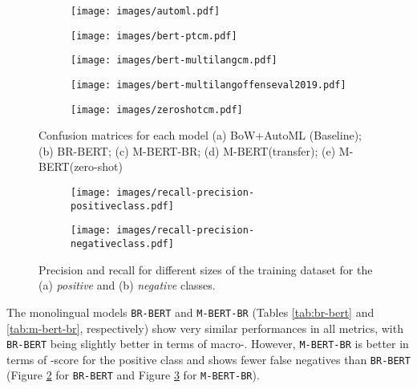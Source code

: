 \documentclass[11pt,a4paper]{article}
\begin{document}
\begin{figure*}[!ht]
\centering
\begin{subfigure}{.4\columnwidth}
  \centering
\texttt{[image: images/automl.pdf]}
  \caption{}
  \label{fig:cm-bow}
\end{subfigure}
\begin{subfigure}{.4\columnwidth}
\centering
\texttt{[image: images/bert-ptcm.pdf]}
  \caption{}
  \label{fig:cm-br-bert}
\end{subfigure}
\begin{subfigure}{.4\columnwidth}
  \centering
\texttt{[image: images/bert-multilangcm.pdf]}
  \caption{}
  \label{fig:cm-m-bert-br}
\end{subfigure}
\begin{subfigure}{.4\columnwidth}
  \centering
\texttt{[image: images/bert-multilangoffenseval2019.pdf]}
  \caption{}
  \label{fig:cm-m-bert-zero}
\end{subfigure}
\begin{subfigure}{.4\columnwidth}
  \centering
\texttt{[image: images/zeroshotcm.pdf]} 
  \caption{}
  \label{fig:cm-m-bert-transfer}
\end{subfigure}
\caption{Confusion matrices for each model (a) BoW+AutoML (Baseline); (b) BR-BERT; (c) M-BERT-BR; (d) M-BERT(transfer); (e) M-BERT(zero-shot)}
\label{fig:fig}
\end{figure*}

\begin{figure*}
\begin{subfigure}{.5\textwidth}
  \centering
\texttt{[image: images/recall-precision-positiveclass.pdf]}
  \caption{}
  \label{fig:learning-curve-positive}
\end{subfigure}
\begin{subfigure}{.5\textwidth}
  \centering
\texttt{[image: images/recall-precision-negativeclass.pdf]}
  \caption{}
  \label{fig:learning-curve-negative}
  \end{subfigure}
\caption{Precision and recall for different sizes of the training dataset for the (a) \textit{positive} and (b) \textit{negative} classes.}
\label{fig:learning-curve}
\end{figure*}

The monolingual models \texttt{BR-BERT} and \texttt{M-BERT-BR} (Tables \ref{tab:br-bert} and \ref{tab:m-bert-br}, respectively) show very similar performances in all metrics, with \texttt{BR-BERT} being slightly better in terms of macro-. However, \texttt{M-BERT-BR} is better in terms of -score for the positive class and shows fewer false negatives than \texttt{BR-BERT} (Figure \ref{fig:cm-br-bert} for \texttt{BR-BERT} and Figure \ref{fig:cm-m-bert-br} for \texttt{M-BERT-BR}). 
\end{document}

